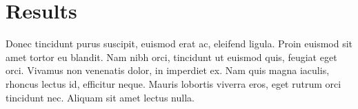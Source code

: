 \section{Results}\label{sec:results}
Donec tincidunt purus suscipit, euismod erat ac, eleifend ligula.
Proin euismod sit amet tortor eu blandit.
Nam nibh orci, tincidunt ut euismod quis, feugiat eget orci.
Vivamus non venenatis dolor, in imperdiet ex.
Nam quis magna iaculis, rhoncus lectus id, efficitur neque.
Mauris lobortis viverra eros, eget rutrum orci tincidunt nec.
Aliquam sit amet lectus nulla.
